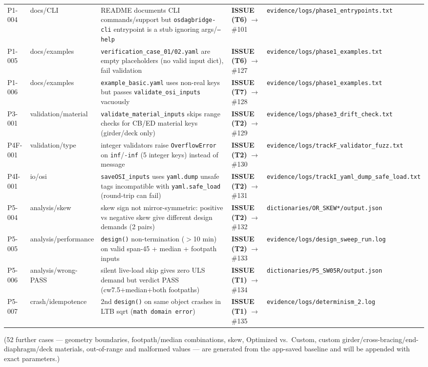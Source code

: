 \documentclass[11pt,a4paper]{article}
\begin{document}
\begin{longtable}{@{}p{1.4cm}p{3.0cm}p{6.2cm}p{2.6cm}p{2.0cm}@{}}
P1-004 & docs/CLI & README documents CLI commands/support but \texttt{osdagbridge-cli} entrypoint is a stub ignoring args/\texttt{--help} & \textbf{ISSUE (T6)} $\rightarrow$ \#101 & \texttt{evidence/logs/phase1\_entrypoints.txt} \\
P1-005 & docs/examples & \texttt{verification\_case\_01/02.yaml} are empty placeholders (no valid input dict), fail validation & \textbf{ISSUE (T6)} $\rightarrow$ \#127 & \texttt{evidence/logs/phase1\_examples.txt} \\
P1-006 & docs/examples & \texttt{example\_basic.yaml} uses non-real keys but passes \texttt{validate\_osi\_inputs} vacuously & \textbf{ISSUE (T7)} $\rightarrow$ \#128 & \texttt{evidence/logs/phase1\_examples.txt} \\
P3-001 & validation/material & \texttt{validate\_material\_inputs} skips range checks for CB/ED material keys (girder/deck only) & \textbf{ISSUE (T2)} $\rightarrow$ \#129 & \texttt{evidence/logs/phase3\_drift\_check.txt} \\
P4F-001 & validation/type & integer validators raise \texttt{OverflowError} on \texttt{inf}/\texttt{-inf} (5 integer keys) instead of message & \textbf{ISSUE (T2)} $\rightarrow$ \#130 & \texttt{evidence/logs/trackF\_validator\_fuzz.txt} \\
P4I-001 & io/osi & \texttt{saveOSI\_inputs} uses \texttt{yaml.dump} unsafe tags incompatible with \texttt{yaml.safe\_load} (round-trip can fail) & \textbf{ISSUE (T2)} $\rightarrow$ \#131 & \texttt{evidence/logs/trackI\_yaml\_dump\_safe\_load.txt} \\
P5-004 & analysis/skew & skew sign not mirror-symmetric: positive vs negative skew give different design demands (2 pairs) & \textbf{ISSUE (T2)} $\rightarrow$ \#132 & \texttt{dictionaries/OR\_SKEW*/output.json} \\
P5-005 & analysis/performance & \texttt{design()} non-termination ($>$10 min) on valid span-45 + median + footpath inputs & \textbf{ISSUE (T2)} $\rightarrow$ \#133 & \texttt{evidence/logs/design\_sweep\_run.log} \\
P5-006 & analysis/wrong-PASS & silent live-load skip gives zero ULS demand but verdict PASS (cw7.5+median+both footpaths) & \textbf{ISSUE (T1)} $\rightarrow$ \#134 & \texttt{dictionaries/P5\_SW05R/output.json} \\
P5-007 & crash/idempotence & 2nd \texttt{design()} on same object crashes in LTB sqrt (\texttt{math domain error}) & \textbf{ISSUE (T1)} $\rightarrow$ \#135 & \texttt{evidence/logs/determinism\_2.log} \\
\bottomrule
\end{longtable}
(52 further cases --- geometry boundaries, footpath/median combinations, skew, Optimized vs.\ Custom, custom girder/cross-bracing/end-diaphragm/deck materials, out-of-range and malformed values --- are generated from the app-saved baseline and will be appended with exact parameters.)
\end{document}
